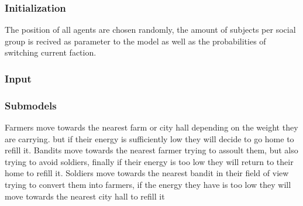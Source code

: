 \documentclass{wscpaperproc}
\theoremstyle{wsc}
\begin{document}
\subsubsection{Initialization}

The position of all agents are chosen randomly, the amount of subjects per
social group is recived as parameter to the model as well as the probabilities
of switching current faction.

\subsubsection{Input}

\subsubsection{Submodels}

Farmers move towards the nearest farm or city hall depending on the weight they
are carrying. but if their energy is sufficiently low they will decide to go
home to refill it. Bandits move towards the nearest farmer trying to assoult
them, but also trying to avoid soldiers, finally if their energy is too low
they will return to their home to refill it. Soldiers move towards the nearest
bandit in their field of view trying to convert them into farmers, if the
energy they have is too low they will move towards the nearest city hall to
refill it



\end{document}

